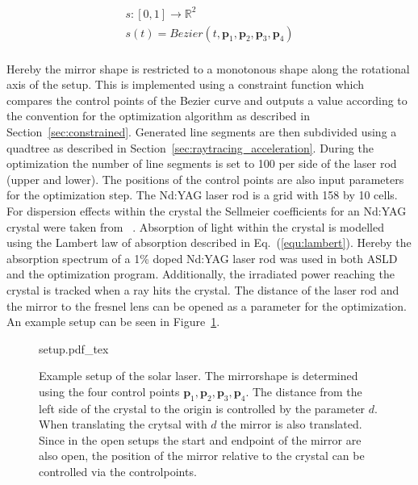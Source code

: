 \documentclass[a4paper,10pt]{article}
\renewcommand{\vec}[1]{\mathbf{#1}}
\newcommand{\equref}[1]{Eq.~(\ref{#1})}
\newcommand{\secref}[1]{Section~\ref{#1}}
\newcommand{\figref}[1]{Figure~\ref{#1}}
\begin{document}
    \begin{equation}
        \label{equ:mirror}
        \begin{gathered}
            s : [0,1] \rightarrow \mathbb{R}^2\\
            s(t) = Bezier(t, \vec{p}_1, \vec{p}_2, \vec{p}_3, \vec{p}_4)\\
        \end{gathered}
    \end{equation}

    Hereby the mirror shape is restricted to a monotonous shape
    along the rotational axis of the setup.
    This is implemented using a constraint function which compares
    the control points of the Bezier curve and outputs a 
    value according to the convention for the optimization algorithm as
    described in \secref{sec:constrained}.
    Generated line segments are then subdivided using a quadtree as described
    in \secref{sec:raytracing_acceleration}.
    During the optimization the number of line segments is set to 100
    per side of the laser rod (upper and lower).
    The positions of the control points are also input parameters
    for the optimization step.
    The Nd:YAG laser rod is a grid with 158 by 10 cells.
    For dispersion effects within the crystal the Sellmeier coefficients
    for an Nd:YAG crystal were taken from ~\cite{sellmeier_ndyag}.
    Absorption of light within the crystal is modelled using the Lambert
    law of absorption described in \equref{equ:lambert}.
    Hereby the absorption spectrum of a 1\% doped Nd:YAG laser
    rod was used in both ASLD and the optimization program.
    Additionally, the irradiated power reaching the crystal is
    tracked when a ray hits the crystal.
    The distance of the laser rod and the mirror to the
    fresnel lens can be opened as a parameter for the optimization.
    An example setup can be seen in \figref{fig:setup_example}.

    \begin{figure}
        \centering
        {setup.pdf_tex}
        \label{fig:setup_example}
        \caption{Example setup of the solar laser. The mirrorshape
        is determined using the four control points 
        $\vec{p}_1,\vec{p}_2,\vec{p}_3,\vec{p}_4$.
        The distance from the left side of the crystal to the origin
        is controlled by the parameter $d$.
        When translating the crytsal with $d$ the mirror is also translated.
        Since in the open setups the start and endpoint of the mirror are
        also open, the position of the mirror relative to the crystal
        can be controlled via the controlpoints.}
    \end{figure}
\end{document}
